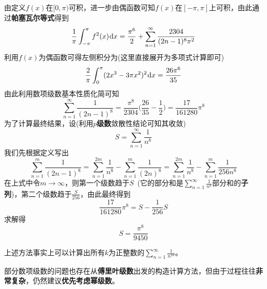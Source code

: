 \documentclass[a4paper,UTF8,fontset=windows,AutoFakeBold]{ctexart}
\newcommand*{\dr}{\hspace{0.07em}\mathrm{d}}
\newcommand*{\suminf}[1][n=1]{\sum_{#1}^\infty}
\newcommand*{\note}{\noindent *}
\theoremstyle{ex}
\begin{document}
\begin{framed}
{\begin{itemize}
        由定义$f(x)$在$[0,\pi)$可积，进一步由偶函数可知$f(x)$在$[-\pi,\pi]$上可积，由此通过\textbf{帕塞瓦尔等式}得到
        $$\frac{1}{\pi}\int_{-\pi}^\pi f^2(x)\dr x=\frac{\pi^6}{2}+\suminf\frac{2304}{(2n-1)^8\pi^2}$$
        利用$f(x)$为偶函数可得左侧积分为(这里直接展开为多项式计算即可)
        $$\frac{2}{\pi}\int_0^\pi(2x^3-3\pi x^2)^2\dr x=\frac{26\pi^6}{35}$$
        由此利用数项级数基本性质化简可知
        $$\suminf\frac{1}{(2n-1)^8}=\frac{\pi^8}{2304}\bigg(\frac{26}{35}-\frac{1}{2}\bigg)=\frac{17}{161280}\pi^8$$
        为了计算最终结果，设(利用\textbf{$p$级数}敛散性结论可知其收敛)
        $$S=\suminf\frac{1}{n^8}$$
        我们先根据定义写出
        $$\sum_{n=1}^m\frac{1}{(2n-1)^8}=\sum_{n=1}^{2m}\frac{1}{n^8}-\sum_{n=1}^m\frac{1}{(2n)^8}=\sum_{n=1}^{2m}\frac{1}{n^8}-\sum_{n=1}^m\frac{1}{256n^8}$$
        在上式中令$m\to\infty$，则第一个级数趋于$S$\ (它的部分和是$\suminf\frac{1}{n^8}$部分和的\textbf{子列})，第二个级数趋于$\frac{S}{256}$，由此最终得到
        $$\frac{17}{161280}\pi^8=S-\frac{1}{256}S$$
        求解得
        $$S=\frac{\pi^8}{9450}$$
    \end{itemize}
}
\end{framed}

\note 上述方法事实上可以计算出所有$k$为正整数的$\suminf\frac{1}{n^{2k}}$。

\note 部分数项级数的问题也存在从\textbf{傅里叶级数}出发的构造计算方法，但由于过程往往\textbf{非常复杂}，仍然建议\textbf{优先考虑幂级数}。
\end{document}
